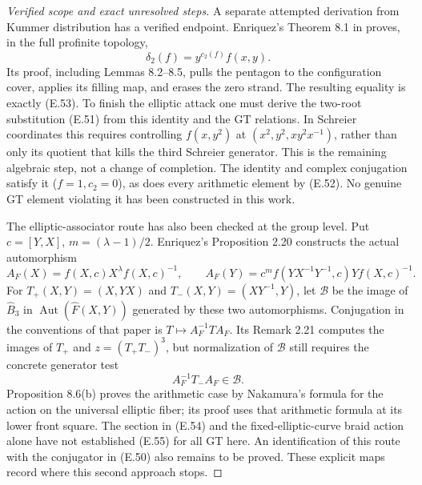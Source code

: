 \begin{proof}[Verified scope and exact unresolved steps]
A separate attempted derivation from Kummer distribution
has a verified endpoint.  Enriquez's Theorem 8.1 in
\cite{ET_Enriquez2007} proves, in the full profinite
topology,
\[
                  \delta_2(f)=y^{c_2(f)}f(x,y).             \tag{E.53}
\]
Its proof, including Lemmas 8.2--8.5, pulls the pentagon
to the configuration cover, applies its filling map,
and erases the zero strand.  The resulting equality
is exactly (E.53).  To finish the elliptic attack one
must derive the two-root substitution (E.51) from this
identity and the GT relations.  In Schreier coordinates
this requires controlling
$f(x,y^2)$ at
$(x^2,y^2,xy^2x^{-1})$, rather than only its quotient
that kills the third Schreier generator.  This is the
remaining algebraic step, not a change of completion.
The identity and complex conjugation satisfy it
($f=1,c_2=0$), as does every arithmetic element by
(E.52).  No genuine GT element violating it has been
constructed in this work.

The elliptic-associator route has also been checked
at the group level.  Put $c=[Y,X]$, $m=(\lambda-1)/2$.
Enriquez's Proposition 2.20 \cite{ET_Enriquez2014}
constructs the actual automorphism
\[
 A_F(X)=f(X,c)X^\lambda f(X,c)^{-1},\qquad
 A_F(Y)=c^m f(YX^{-1}Y^{-1},c)Y f(X,c)^{-1}.
                                                               \tag{E.54}
\]
For $T_+(X,Y)=(X,YX)$ and
$T_-(X,Y)=(XY^{-1},Y)$, let $\mathcal B$ be the
image of $\widehat B_3$ in
$\operatorname{Aut}(\widehat F(X,Y))$ generated by
these two automorphisms.  Conjugation in the conventions
of that paper is $T\mapsto A_F^{-1}TA_F$.
Its Remark 2.21 computes the images of $T_+$ and
$z=(T_+T_-)^3$, but normalization of $\mathcal B$
still requires the concrete generator test
\[
                   A_F^{-1}T_-A_F\in\mathcal B.             \tag{E.55}
\]
Proposition 8.6(b) proves the arithmetic case by
Nakamura's formula for the action on the universal
elliptic fiber; its proof uses that arithmetic
formula at its lower front square.  The section in
(E.54) and the fixed-elliptic-curve braid action alone
have not established (E.55) for all GT here.  An
identification of this route with the conjugator in
(E.50) also remains to be proved.  These explicit
maps record where this second approach stops.
\end{proof}

